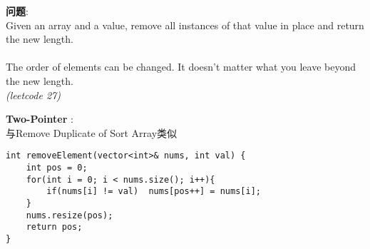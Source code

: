     
\begin{description}
    \item{\textbf{问题}}:\\
Given an array and a value, remove all instances of that value in place and return the new length.\\
\\
The order of elements can be changed. It doesn't matter what you leave beyond the new length.\\
\textit{(leetcode 27)}
    \item{\textbf{Two-Pointer}} : 
    \\与Remove Duplicate of Sort Array类似
    \begin{lstlisting}
int removeElement(vector<int>& nums, int val) {
	int pos = 0;
	for(int i = 0; i < nums.size(); i++){
		if(nums[i] != val)	nums[pos++] = nums[i];
	}
	nums.resize(pos);
	return pos;
}
    \end{lstlisting}
\end{description}
